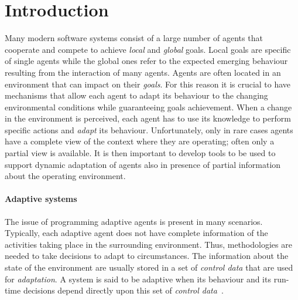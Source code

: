 
\section{Introduction} %
\label{sec:introduction}

Many modern software systems consist of a large number of agents that cooperate and compete \cite{}
to achieve \emph{local} and \emph{global} goals. Local goals are specific of single agents
while the global ones refer to the expected emerging behaviour resulting from the interaction of many agents. 
Agents are often located in an environment that can impact on their \emph{goals}.  
For this reason it is crucial to have mechanisms that allow each agent to adapt its behaviour to
the changing environmental conditions while guaranteeing goals achievement. When a change in the environment is perceived, each agent has to use its knowledge to perform specific actions and \emph{adapt} its behaviour.
Unfortunately, only in rare cases agents have a complete view of the context where they are operating;  often only a partial view is available.  It is then important to develop tools to be used 
to support dynamic adaptation of agents also in presence of partial information about the operating environment.

\paragraph{Adaptive systems} %
\label{par:adaptive_systems}
The issue of programming adaptive agents is present in many scenarios. Typically, each adaptive agent 
does not have complete information of the activities taking place in the surrounding environment. 
Thus, 
methodologies are needed to take decisions to adapt to circumstances. The information about the state of the environment are usually stored in a set of \emph{control data} that are used for \emph{adaptation}. A system is said to be adaptive when its behaviour and its run-time decisions depend directly upon this set of \emph{control data}~\cite{BruniCGLV12}.

